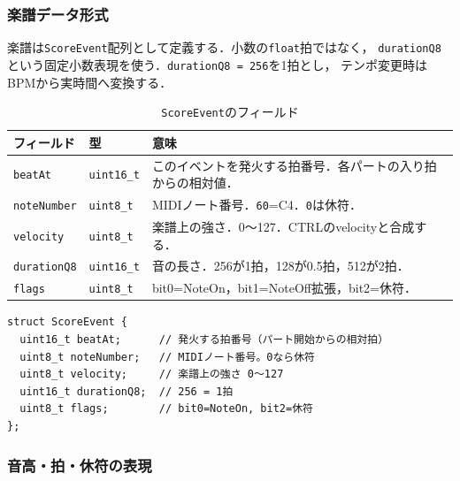 \documentclass[lualatex,book,paper=a4paper,jafontsize=11.5pt,jafontscale=1.05]{jlreq}
\newcommand{\code}[1]{\texttt{#1}}
\begin{document}
\subsubsection{楽譜データ形式}

楽譜は\code{ScoreEvent}配列として定義する．小数の\code{float}拍ではなく，
\code{durationQ8}という固定小数表現を使う．\code{durationQ8 = 256}を1拍とし，
テンポ変更時はBPMから実時間へ変換する．

\begin{table}[H]
\centering
\caption{\code{ScoreEvent}のフィールド}
\label{tab:scoreevent}
\begin{tabular}{p{}p{}p{}}
\toprule
\textbf{フィールド} & \textbf{型} & \textbf{意味} \\
\midrule
\code{beatAt} & \code{uint16\_t} & このイベントを発火する拍番号．各パートの入り拍からの相対値．\\
\code{noteNumber} & \code{uint8\_t} & MIDIノート番号．\code{60}=C4．\code{0}は休符．\\
\code{velocity} & \code{uint8\_t} & 楽譜上の強さ．0〜127．CTRLのvelocityと合成する．\\
\code{durationQ8} & \code{uint16\_t} & 音の長さ．256が1拍，128が0.5拍，512が2拍．\\
\code{flags} & \code{uint8\_t} & bit0=NoteOn，bit1=NoteOff拡張，bit2=休符．\\
\bottomrule
\end{tabular}
\end{table}

\begin{verbatim}
struct ScoreEvent {
  uint16_t beatAt;      // 発火する拍番号（パート開始からの相対拍）
  uint8_t noteNumber;   // MIDIノート番号。0なら休符
  uint8_t velocity;     // 楽譜上の強さ 0〜127
  uint16_t durationQ8;  // 256 = 1拍
  uint8_t flags;        // bit0=NoteOn, bit2=休符
};
\end{verbatim}

\subsubsection{音高・拍・休符の表現}
\end{document}
